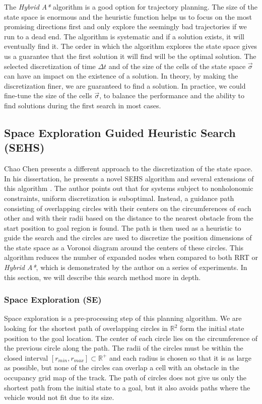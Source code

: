 The \textit{Hybrid A*} algorithm is a good option for trajectory planning. The size of the state space is enormous and the heuristic function helps us to focus on the most promising directions first and only explore the seemingly bad trajectories if we run to a dead end. The algorithm is systematic and if a solution exists, it will eventually find it. The order in which the algorithm explores the state space gives us a guarantee that the first solution it will find will be the optimal solution. The selected discretization of time $\Delta t$ and of the size of the cells of the state space $\vec{\sigma}$ can have an impact on the existence of a solution. In theory, by making the discretization finer, we are guaranteed to find a solution. In practice, we could fine-tune the size of the cells $\vec{\sigma}$, to balance the performance and the ability to find solutions during the first search in most cases.

\subsection{Space Exploration Guided Heuristic Search (SEHS)}

Chao Chen presents a different approach to the discretization of the state space. In his dissertation, he presents a novel \gls{SEHS} algorithm and several extensions of this algorithm \cite{SEHS}. The author points out that for systems subject to nonholonomic constraints, uniform discretization is suboptimal. Instead, a guidance path consisting of overlapping circles with their centers on the circumferences of each other and with their radii based on the distance to the nearest obstacle from the start position to goal region is found. The path is then used as a heuristic to guide the search and the circles are used to discretize the position dimensions of the state space as a Voronoi diagram around the centers of these circles. This algorithm reduces the number of expanded nodes when compared to both \gls*{RRT} or \textit{Hybrid A*}, which is demonstrated by the author on a series of experiments. In this section, we will describe this search method more in depth.

\subsubsection{Space Exploration (SE)}
\label{sec:space_exploration}

Space exploration is a pre-processing step of this planning algorithm. We are looking for the shortest path of overlapping circles in $\mathbb{R}^2$ form the initial state position to the goal location. The center of each circle lies on the circumference of the previous circle along the path. The radii of the circles must be within the closed interval $\left[r_{min}, r_{max}\right]\subset \mathbb{R}^{+}$ and each radius is chosen so that it is as large as possible, but none of the circles can overlap a cell with an obstacle in the occupancy grid map of the track. The path of circles does not give us only the shortest path from the initial state to a goal, but it also avoids paths where the vehicle would not fit due to its size.

